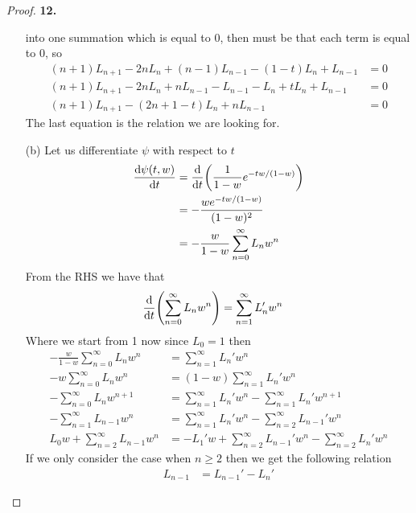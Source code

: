 \documentclass[11pt]{article}
\theoremstyle{definition}
\begin{document}
\begin{proof}{\textbf{12.}}
\begin{itemize}
into one summation which is equal to 0, then must be that each term is equal
to 0, so
\begin{align*}
    (n + 1) L_{n + 1} -2 nL_{n} + (n - 1) L_{n-1}
    - (1 - t)L_{n} + L_{n-1} &= 0\\
    (n + 1) L_{n + 1} -2 nL_{n} + nL_{n-1} - L_{n-1}
    - L_n + tL_{n} + L_{n-1} &= 0\\
    (n + 1) L_{n + 1} -(2n + 1 - t)L_{n} + nL_{n-1} &= 0
\end{align*}
The last equation is the relation we are looking for.
\item[(b)] Let us differentiate $\psi$ with respect to $t$
\begin{align*}
    \dv{\psi(t,w)}{t} &= \dv{t}(\frac{1}{1 - w}e^{-tw/(1-w)})\\
    &= -\frac{we^{-tw/(1-w)}}{(1 - w)^2}\\
    &= -\frac{w}{1 - w}\sum_{n=0}^\infty L_n w^n
\end{align*}
From the RHS we have that
\begin{align*}
    \dv{t}(\sum_{n=0}^\infty L_n w^n) &= \sum_{n=1}^\infty L_n' w^{n}
\end{align*}
Where we start from 1 now since $L_0 = 1$ then
\begin{align*}
    -\frac{w}{1 - w}\sum_{n=0}^\infty L_n w^n
    &= \sum_{n=1}^\infty L_n' w^{n}\\
    -w\sum_{n=0}^\infty L_n w^n
    &= (1 - w)\sum_{n=1}^\infty L_n' w^{n}\\
    -\sum_{n=0}^\infty L_n w^{n+1}
    &= \sum_{n=1}^\infty L_n' w^{n}  - \sum_{n=1}^\infty L_n' w^{n+1}\\
    -\sum_{n=1}^\infty L_{n-1} w^{n}
    &= \sum_{n=1}^\infty L_n' w^{n}  - \sum_{n=2}^\infty L_{n-1}' w^{n}\\
    L_0w + \sum_{n=2}^\infty L_{n-1} w^{n}
    &=  - L_1'w + \sum_{n=2}^\infty L_{n-1}' w^{n} - \sum_{n=2}^\infty L_n' w^{n}
\end{align*}
If we only consider the case when $n \geq 2$ then we get the following relation
\begin{align*}
    L_{n-1} &= L_{n-1}' - L_n'
\end{align*}
\end{itemize}
\end{proof}
\end{document}
